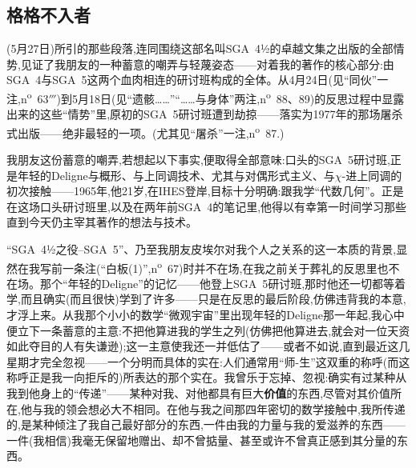 \subsection{格格不入者}


(5月27日)所引的那些段落,连同围绕这部名叫SGA~4½的卓越文集之出版的全部情势,见证了我朋友的一种蓄意的嘲弄与轻蔑姿态——对着我的著作的核心部分:由SGA~4与SGA~5这两个血肉相连的研讨班构成的全体。从4月24日(见“同伙”一注,n\textsuperscript{o}~63$'''$)到5月18日(见“遗骸……”“……与身体”两注,n\textsuperscript{o}~88、89)的反思过程中显露出来的这些“情势”里,原初的SGA~5研讨班遭到劫掠——落实为1977年的那场屠杀式出版——绝非最轻的一项。(尤其见“屠杀”一注,n\textsuperscript{o}~87.)

我朋友这份蓄意的嘲弄,若想起以下事实,便取得全部意味:口头的SGA~5研讨班,正是年轻的Deligne\dmark{}与概形、与上同调技术、尤其与对偶形式主义、与$\chi$-进上同调的初次接触——1965年,他21岁,在IHES登岸,目标十分明确:跟我学“代数几何”。正是在这场口头研讨班里,以及在两年前SGA~4的笔记里,他得以有幸第一时间学习那些直到今天仍主宰其著作的想法与技术。

“SGA~4½之役--SGA~5”、乃至我朋友皮埃尔对我个人之关系的这一本质的背景,显然在我写前一条注(“白板(1)”,n\textsuperscript{o}~67)时并不在场,在我之前关于葬礼的反思里也不在场。那个“年轻的Deligne”的记忆——他登上SGA~5研讨班,那时他还一切都等着学,而且确实(而且很快)学到了许多——只是在反思的最后阶段,仿佛违背我的本意,才浮上来。从我那个小小的数学“微观宇宙”里出现年轻的Deligne那一年起,我心中便立下一条蓄意的主意:不把他算进我的学生之列(仿佛把他算进去,就会对一位天资如此夺目的人有失谦逊);这一主意使我还一并低估了——或者不如说,直到最近这几星期才完全忽视——一个分明而具体的实在:人们通常用“师-生”这双重的称呼(而这称呼正是我一向拒斥的)所表达的那个实在。我曾乐于忘掉、忽视:确实有过某种从我到他身上的“传递”——某种对我、对他都具有巨大\textbf{价值}的东西,尽管对其价值所在,他与我的领会想必大不相同。在他与我之间那四年密切的数学接触中,我所传递的,是某种倾注了我自己最好部分的东西,一件由我的力量与我的爱滋养的东西——一件(我相信)我毫无保留地赠出、却不曾掂量、甚至或许不曾真正感到其分量的东西。


